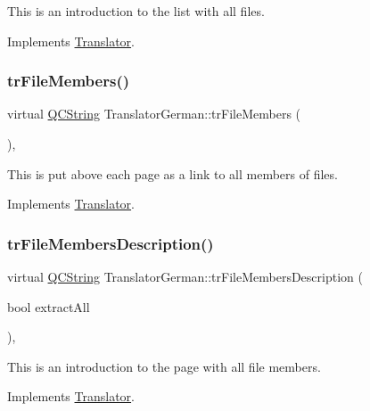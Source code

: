This is an introduction to the list with all files. 

Implements \mbox{\hyperlink{class_translator}{Translator}}.

\mbox{\label{class_translator_german_a7a0fafda7f4ed93cb3a3ec504f32070a}} 
\subsubsection{\texorpdfstring{trFileMembers()}{trFileMembers()}}
{\footnotesize\ttfamily virtual \mbox{\hyperlink{class_q_c_string}{Q\+C\+String}} Translator\+German\+::tr\+File\+Members (\begin{DoxyParamCaption}{ }\end{DoxyParamCaption})\hspace{0.3cm}{\ttfamily [inline]}, {\ttfamily [virtual]}}

This is put above each page as a link to all members of files. 

Implements \mbox{\hyperlink{class_translator}{Translator}}.

\mbox{\label{class_translator_german_aa555e48a6dccb62fa84f2323aba17704}} 
\subsubsection{\texorpdfstring{trFileMembersDescription()}{trFileMembersDescription()}}
{\footnotesize\ttfamily virtual \mbox{\hyperlink{class_q_c_string}{Q\+C\+String}} Translator\+German\+::tr\+File\+Members\+Description (\begin{DoxyParamCaption}\item[{bool}]{extract\+All }\end{DoxyParamCaption})\hspace{0.3cm}{\ttfamily [inline]}, {\ttfamily [virtual]}}

This is an introduction to the page with all file members. 

Implements \mbox{\hyperlink{class_translator}{Translator}}.

\mbox{\label{class_translator_german_aca3b37d9b43c9df7eed54ef463248876}} 
